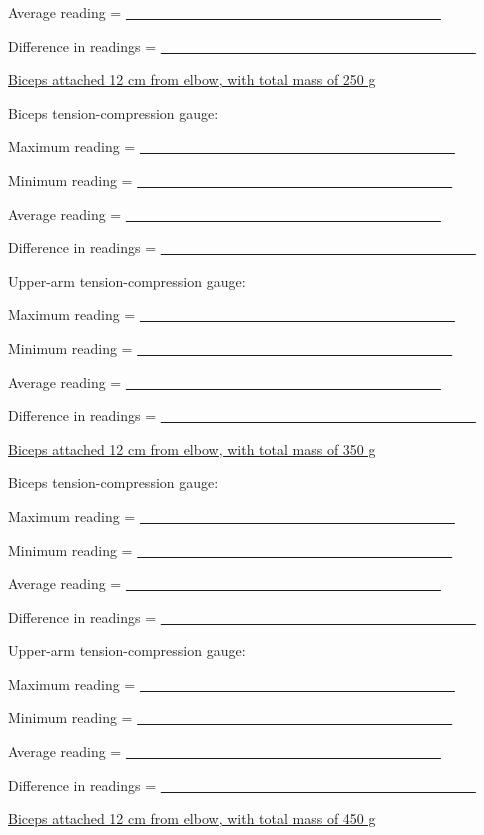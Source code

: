 \begin{enumerate}[label=\arabic*.]
Average reading = \ul{~~~~~~~~~~~~~~~~~~~~~~~~~~~~~~~~~~~~~~~~~~~~~}

Difference in readings = \ul{~~~~~~~~~~~~~~~~~~~~~~~~~~~~~~~~~~~~~~~~~~~~~}

\ul{Biceps attached 12 cm from elbow, with total mass of 250 g}

Biceps tension-compression gauge:

Maximum reading = \ul{~~~~~~~~~~~~~~~~~~~~~~~~~~~~~~~~~~~~~~~~~~~~~}

Minimum reading = \ul{~~~~~~~~~~~~~~~~~~~~~~~~~~~~~~~~~~~~~~~~~~~~~}

Average reading = \ul{~~~~~~~~~~~~~~~~~~~~~~~~~~~~~~~~~~~~~~~~~~~~~}

Difference in readings = \ul{~~~~~~~~~~~~~~~~~~~~~~~~~~~~~~~~~~~~~~~~~~~~~}

Upper-arm tension-compression gauge:

Maximum reading = \ul{~~~~~~~~~~~~~~~~~~~~~~~~~~~~~~~~~~~~~~~~~~~~~}

Minimum reading = \ul{~~~~~~~~~~~~~~~~~~~~~~~~~~~~~~~~~~~~~~~~~~~~~}

Average reading = \ul{~~~~~~~~~~~~~~~~~~~~~~~~~~~~~~~~~~~~~~~~~~~~~}

Difference in readings = \ul{~~~~~~~~~~~~~~~~~~~~~~~~~~~~~~~~~~~~~~~~~~~~~}

\ul{Biceps attached 12 cm from elbow, with total mass of 350 g}

Biceps tension-compression gauge:

Maximum reading = \ul{~~~~~~~~~~~~~~~~~~~~~~~~~~~~~~~~~~~~~~~~~~~~~}

Minimum reading = \ul{~~~~~~~~~~~~~~~~~~~~~~~~~~~~~~~~~~~~~~~~~~~~~}

Average reading = \ul{~~~~~~~~~~~~~~~~~~~~~~~~~~~~~~~~~~~~~~~~~~~~~}

Difference in readings = \ul{~~~~~~~~~~~~~~~~~~~~~~~~~~~~~~~~~~~~~~~~~~~~~}

Upper-arm tension-compression gauge:

Maximum reading = \ul{~~~~~~~~~~~~~~~~~~~~~~~~~~~~~~~~~~~~~~~~~~~~~}

Minimum reading = \ul{~~~~~~~~~~~~~~~~~~~~~~~~~~~~~~~~~~~~~~~~~~~~~}

Average reading = \ul{~~~~~~~~~~~~~~~~~~~~~~~~~~~~~~~~~~~~~~~~~~~~~}

Difference in readings = \ul{~~~~~~~~~~~~~~~~~~~~~~~~~~~~~~~~~~~~~~~~~~~~~}

\ul{Biceps attached 12 cm from elbow, with total mass of 450 g}


\end{enumerate}
